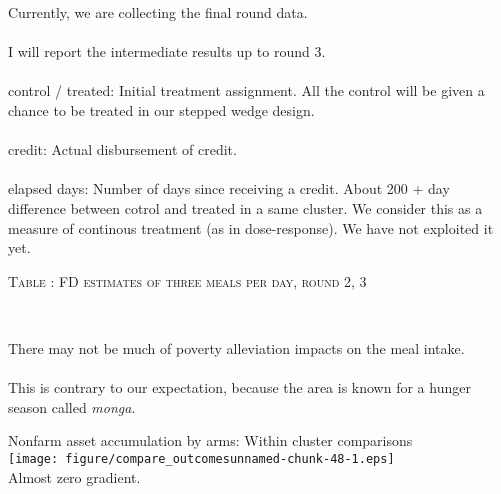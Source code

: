 \begin{frame}{}
Currently, we are collecting the final round data.\\~\\
\pause
I will report the intermediate results up to round 3.\\~\\

\pause
\textsf{control / treated}: Initial treatment assignment. All the control will be given a chance to be treated in our stepped wedge design.\\~\\

\pause
\textsf{credit}: Actual disbursement of credit.\\~\\

\pause
\textsf{elapsed days}: Number of days since receiving a credit. About 200 + day difference between \textsf{cotrol} and \textsf{treated} in a same cluster. We consider this as a measure of continous treatment (as in dose-response). \pause We have not exploited it yet.
\end{frame}

\begin{frame}{}
\hfil\textsc{\footnotesize Table \thetable: FD estimates of three meals per day, round 2, 3\label{FD3meals}}\\
\setlength{\tabcolsep}{1pt}
\renewcommand{\arraystretch}{.6}
\hfil{}\\
\renewcommand{\arraystretch}{1}
\end{frame}

\begin{frame}{}
There may not be much of poverty alleviation impacts on the meal intake. \\~\\
\pause
\vspace{2ex}
This is contrary to our expectation, because the area is known for a hunger season called \textit{monga}.
\end{frame}

\begin{frame}{}
Nonfarm asset accumulation by arms: Within cluster comparisons\\
\hfil\texttt{[image: figure/compare\_outcomesunnamed-chunk-48-1.eps]} \\

\pause
Almost zero gradient.
\end{frame}

